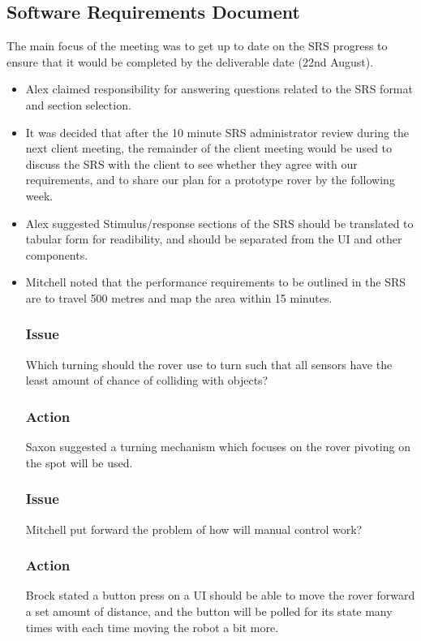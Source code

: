 \documentclass{article}
\begin{document}
	\subsection{Software Requirements Document}
    The main focus of the meeting was to get up to date on the SRS progress to ensure that it would be completed by the deliverable date (22nd August).
 	\begin{itemize}
    \item Alex claimed responsibility for answering questions related to the SRS format and section selection.
    \item It was decided that after the 10 minute SRS administrator review during the next client meeting, the remainder of the client meeting would be used to discuss the SRS with the client to see whether they agree with our requirements, and to share our plan for a prototype rover by the following week.
    \item Alex suggested Stimulus/response sections of the SRS should be translated to tabular form for readibility, and should be separated from the UI and other components.
    \item Mitchell noted that the performance requirements to be outlined in the SRS are to travel 500 metres and map the area within 15 minutes.
    \subsubsection*{Issue}
    Which turning should the rover use to turn such that all sensors have the least amount of chance of colliding with objects?
    \subsubsection*{Action}
    Saxon suggested a turning mechanism which focuses on the rover pivoting on the spot will be used.
    \subsubsection*{Issue}
    Mitchell put forward the problem of how will manual control work?
    \subsubsection*{Action}
    Brock stated a button press on a UI should be able to move the rover forward a set amount of distance, and the button will be polled for its state many times with each time moving the robot a bit more.   
    \end{itemize}
 
\end{document}

